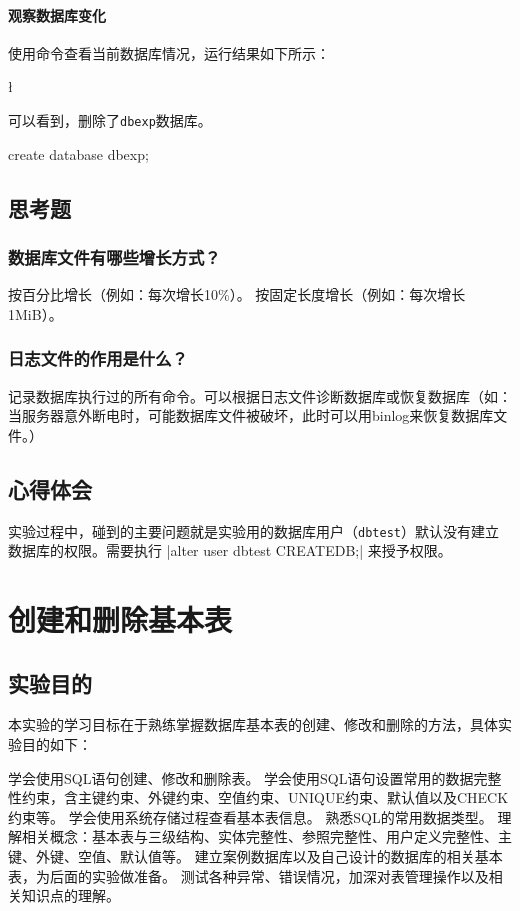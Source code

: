 \documentclass{ctexrep}
\begin{document}
\subsubsection{观察数据库变化}
使用\sql{\l}命令查看当前数据库情况，运行结果如下所示：
\begin{run}
\l
\end{run}
可以看到，删除了\texttt{dbexp}数据库。

\begin{runsilent}
    create database dbexp;
\end{runsilent}
\renewcommand{\pgdb}{dbexp}

\section{思考题}
\subsection*{数据库文件有哪些增长方式？}
\begin{outline}[enumerate]
    \1 按百分比增长（例如：每次增长10\%）。
    \1 按固定长度增长（例如：每次增长1MiB）。
\end{outline}
\subsection*{日志文件的作用是什么？}
记录数据库执行过的所有命令。可以根据日志文件诊断数据库或恢复数据库（如：当服务器意外断电时，可能数据库文件被破坏，此时可以用binlog来恢复数据库文件。）

\section{心得体会}

实验过程中，碰到的主要问题就是实验用的数据库用户（\texttt{dbtest}）默认没有建立数据库的权限。需要执行 \sql|alter user dbtest CREATEDB;| 来授予权限。

\chapter{创建和删除基本表}
\section{实验目的}
本实验的学习目标在于熟练掌握数据库基本表的创建、修改和删除的方法，具体实验目的如下：
\begin{outline}[enumerate]
    \1 学会使用SQL语句创建、修改和删除表。
    \1 学会使用SQL语句设置常用的数据完整性约束，含主键约束、外键约束、空值约束、UNIQUE约束、默认值以及CHECK约束等。
    \1 学会使用系统存储过程查看基本表信息。
    \1 熟悉SQL的常用数据类型。
    \1 理解相关概念：基本表与三级结构、实体完整性、参照完整性、用户定义完整性、主键、外键、空值、默认值等。
    \1 建立案例数据库以及自己设计的数据库的相关基本表，为后面的实验做准备。
    \1 测试各种异常、错误情况，加深对表管理操作以及相关知识点的理解。
\end{outline}
\end{document}
